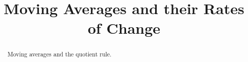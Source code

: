 \documentclass{ximera}
\title{Moving Averages and their Rates of Change}
\begin{document}
\begin{abstract}
Moving averages and the quotient rule.
\end{abstract}
\maketitle
\end{document}
